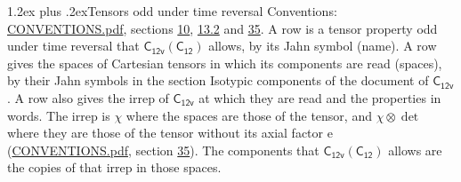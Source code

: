 \documentclass[10pt,a4paper]{article}
\makeatletter
\renewcommand\section{\@startsection{section}{1}{\z@}{-3ex plus -1ex minus -.2ex}%
  {1.2ex plus .2ex}{\normalfont\large\sffamily\bfseries\color{parttitle}}}
\numberwithin{equation}{section}
\newcommand{\grp}[1]{\mathsf{#1}}
\newcommand{\irrprod}{\otimes}
\makeatother
\begin{document}
\section{Tensors odd under time reversal}\label{s:time_odd}
Conventions: \href{../../CONVENTIONS.pdf}{CONVENTIONS.pdf}, sections \href{../../../rotation/CONVENTIONS.pdf\#conv.10}{10}, \href{../../../rotation/CONVENTIONS.pdf\#conv.13.2}{13.2} and \href{../../CONVENTIONS.pdf\#conv.35}{35}.
\leavevmode\label{n:head.name.property}A row is a tensor property odd under time reversal that $\grp{C_{12v}}(\grp{C_{12}})$ allows, by its Jahn symbol (name). \label{n:head.spaces}A row gives the spaces of Cartesian tensors in which its components are read (spaces), by their Jahn symbols in the section Isotypic components of the document of \href{../../../rotation/data/pdf/C12v.pdf}{$\grp{C_{12v}}$}. \label{n:head.properties}A row also gives the irrep of $\grp{C_{12v}}$ at which they are read and the properties in words. The irrep is $\chi$ where the spaces are those of the tensor, and $\chi \irrprod \det$ where they are those of the tensor without its axial factor e (\href{../../CONVENTIONS.pdf}{CONVENTIONS.pdf}, section \href{../../CONVENTIONS.pdf\#conv.35}{35}). The components that $\grp{C_{12v}}(\grp{C_{12}})$ allows are the copies of that irrep in those spaces.
\end{document}

